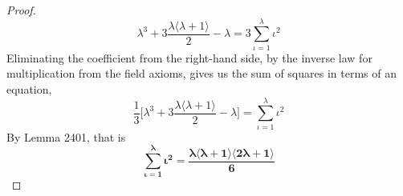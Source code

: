 \documentclass[preview]{standalone}
\begin{document}
\begin{proof}
    \begin{equation*}
        \lambda ^3 
            + 
        3 \frac{ \lambda \big \langle \lambda + 1 \big \rangle }
        {2} 
            - 
        \lambda 
            = 
        3 \sum_{\iota=1}^\lambda \iota ^2
    \end{equation*}
    Eliminating the coefficient  from the right-hand side, 
    by the inverse law for multiplication from the field axioms, 
    gives us the sum of squares in terms of an equation, 
    \begin{equation*}
        \frac{1}{3}
        \bigg[
            \lambda ^3 
                + 
            3 \frac{ \lambda \big \langle \lambda + 1 \big \rangle }
            {2} 
                - 
            \lambda
        \bigg]
            = 
        \sum_{\iota=1}^\lambda \iota ^2
    \end{equation*}
    By Lemma 2401, that is
    \begin{equation*}
        \bm{
            \sum_{\iota=1}^\lambda \iota ^2 
                = 
            \frac{ 
                \lambda \big \langle \lambda + 1 \big \rangle
                \big \langle 2 \lambda + 1 \big \rangle 
            }
            {6}
        }
    \end{equation*}
\end{proof}
\end{document}
